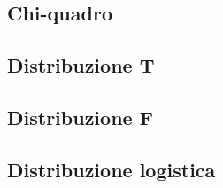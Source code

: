 \documentclass[]{article}
\begin{document}
    \subsection{Chi-quadro}

    \subsection{Distribuzione T}

    \subsection{Distribuzione F}

    \subsection{Distribuzione logistica}
\end{document}

